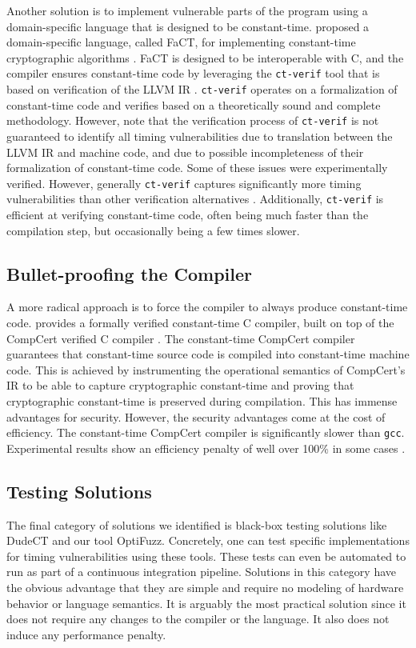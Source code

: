 Another solution is to implement vulnerable parts of the program using a domain-specific language that is designed to be constant-time.
\citeauthor{fact} proposed a domain-specific language, called FaCT, for implementing constant-time cryptographic algorithms \citep{fact}.
FaCT is designed to be interoperable with C, and the compiler ensures constant-time code by leveraging the \texttt{ct-verif} tool that is based on verification of the LLVM IR \citep{verifying-constant-time-llvm}.
\texttt{ct-verif} operates on a formalization of constant-time code and verifies based on a theoretically sound and complete methodology.
However, \citeauthor{verifying-constant-time-llvm} note that the verification process of \texttt{ct-verif} is not guaranteed to identify all timing vulnerabilities due to translation between the LLVM IR and machine code, and due to possible incompleteness of their formalization of constant-time code. 
Some of these issues were experimentally verified.
However, generally \texttt{ct-verif} captures significantly more timing vulnerabilities than other verification alternatives \citep{verifying-constant-time-llvm}.
Additionally, \texttt{ct-verif} is efficient at verifying constant-time code, often being much faster than the compilation step, but occasionally being a few times slower.

\subsection{Bullet-proofing the Compiler}
A more radical approach is to force the compiler to always produce constant-time code.
\citeauthor{verified-constant-time-c-comiler} provides a formally verified constant-time C compiler, built on top of the CompCert verified C compiler \citep{verified-constant-time-c-comiler}. 
The constant-time CompCert compiler guarantees that constant-time source code is compiled into constant-time machine code.
This is achieved by instrumenting the operational semantics of CompCert's IR to be able to capture cryptographic constant-time and proving that cryptographic constant-time is preserved during compilation. 
This has immense advantages for security.
However, the security advantages come at the cost of efficiency. 
The constant-time CompCert compiler is significantly slower than \texttt{gcc}.
Experimental results show an efficiency penalty of well over 100\% in some cases \citep{verified-constant-time-c-comiler}.

\subsection{Testing Solutions}
The final category of solutions we identified is black-box testing solutions like DudeCT \citep{dudect} and our tool OptiFuzz.
Concretely, one can test specific implementations for timing vulnerabilities using these tools.
These tests can even be automated to run as part of a continuous integration pipeline.
Solutions in this category have the obvious advantage that they are simple and require no modeling of hardware behavior or language semantics.
It is arguably the most practical solution since it does not require any changes to the compiler or the language.
It also does not induce any performance penalty.

